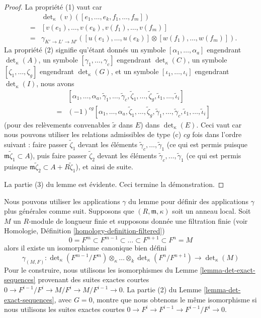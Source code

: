 \begin{proof}
\medskip\noindent
La propriété (1) vaut car
\begin{eqnarray*}
& & \det\nolimits_\kappa(v)([e_1, \ldots, e_k, f_1, \ldots, f_m]) \\
& = &
[v(e_1), \ldots, v(e_k), v(f_1), \ldots, v(f_m)] \\
& = &
\gamma_{K' \to L' \to M'}([u(e_1), \ldots, u(e_k)]
\otimes [w(f_1), \ldots, w(f_m)]).
\end{eqnarray*}
La propriété (2) signifie qu'étant donnés un symbole
$[\alpha_1, \ldots, \alpha_a]$ engendrant $\det_\kappa(A)$,
un symbole $[\gamma_1, \ldots, \gamma_c]$ engendrant $\det_\kappa(C)$,
un symbole $[\zeta_1, \ldots, \zeta_g]$ engendrant $\det_\kappa(G)$, et
un symbole $[\iota_1, \ldots, \iota_i]$ engendrant $\det_\kappa(I)$,
nous avons
\begin{eqnarray*}
& & [\alpha_1, \ldots, \alpha_a, \tilde\gamma_1, \ldots, \tilde\gamma_c,
\tilde\zeta_1, \ldots, \tilde\zeta_g, \tilde\iota_1, \ldots, \tilde\iota_i] \\
& = &
(-1)^{cg} [\alpha_1, \ldots, \alpha_a, \tilde\zeta_1, \ldots, \tilde\zeta_g,
\tilde\gamma_1, \ldots, \tilde\gamma_c, \tilde\iota_1, \ldots, \tilde\iota_i]
\end{eqnarray*}
(pour des relèvements convenables $\tilde{x}$ dans $E$) dans $\det_\kappa(E)$.
Ceci vaut car nous pouvons utiliser les relations admissibles de type (c)
$cg$ fois dans l'ordre suivant : faire passer
$\tilde\zeta_1$ devant les éléments
$\tilde\gamma_c, \ldots, \tilde\gamma_1$
(ce qui est permis puisque $\mathfrak m\tilde\zeta_1 \subset A$),
puis faire passer $\tilde\zeta_2$ devant les éléments
$\tilde\gamma_c, \ldots, \tilde\gamma_1$
(ce qui est permis puisque $\mathfrak m\tilde\zeta_2 \subset A + R\tilde\zeta_1$),
et ainsi de suite.

\medskip\noindent
La partie (3) du lemme est évidente.
Ceci termine la démonstration.
\end{proof}

\noindent
Nous pouvons utiliser les applications $\gamma$ du lemme pour définir des applications
$\gamma$ plus générales comme suit. Supposons que $(R, \mathfrak m, \kappa)$ soit un
anneau local. Soit $M$ un $R$-module de longueur finie et supposons donnée
une filtration finie (voir
Homologie, Définition \ref{homology-definition-filtered})
$$
0 = F^m \subset F^{m - 1} \subset \ldots \subset F^{n + 1} \subset F^n = M
$$
alors il existe un isomorphisme canonique bien défini
$$
\gamma_{(M, F)} :
\det\nolimits_\kappa(F^{m - 1}/F^m) \otimes_\kappa \ldots \otimes_k 
\det\nolimits_\kappa(F^n/F^{n + 1})
\longrightarrow
\det\nolimits_\kappa(M)
$$
Pour le construire, nous utilisons les isomorphismes du Lemme \ref{lemma-det-exact-sequences}
provenant des suites exactes courtes
$0 \to F^{i - 1}/F^i \to M/F^i \to M/F^{i - 1} \to 0$.
La partie (2) du Lemme \ref{lemma-det-exact-sequences}, avec $G = 0$, montre
que nous obtenons le même isomorphisme si nous utilisons les suites exactes courtes
$0 \to F^i \to F^{i - 1} \to F^{i - 1}/F^i \to 0$.

